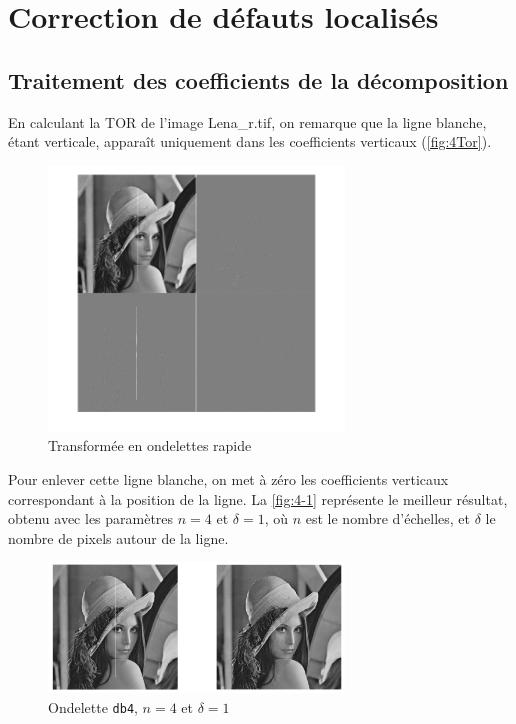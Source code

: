 \documentclass[12pt]{article}
\begin{document}
\section{Correction de défauts localisés}
\subsection{Traitement des coefficients de la décomposition}
En calculant la TOR de l'image \textsf{Lena\_r.tif}, on remarque que la ligne blanche, étant verticale, apparaît uniquement dans les coefficients verticaux (\autoref{fig:4Tor}).

\begin{figure}[!h]
	\centering
	\includegraphics[width = 0.7\textwidth]{images/4TOR}
	\caption{Transformée en ondelettes rapide}
	\label{fig:4Tor}
\end{figure}

Pour enlever cette ligne blanche, on met à zéro les coefficients verticaux
correspondant à la position de la ligne. La \autoref{fig:4-1} représente le meilleur
résultat, obtenu avec les paramètres $n=4$ et $\delta=1$, où $n$ est le nombre
d'échelles, et $\delta$ le nombre de pixels autour de la ligne.

\begin{figure}[!h]
	\centering
	\includegraphics[width = 0.7\textwidth]{images/4-1db4copie}
	\caption{Ondelette \texttt{db4}, $n=4$ et $\delta=1$}
	\label{fig:4-1}
\end{figure}
\end{document}
